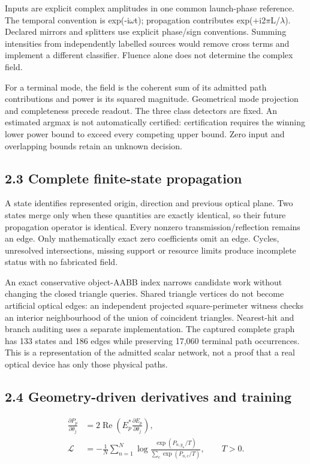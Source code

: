 \documentclass[11pt]{article}
\begin{document}
Inputs are explicit complex amplitudes in one common launch-phase reference. The temporal convention is exp(-i$\omega$t); propagation contributes exp(+i2$\pi$L/$\lambda$). Declared mirrors and splitters use explicit phase/sign conventions. Summing intensities from independently labelled sources would remove cross terms and implement a different classifier. Fluence alone does not determine the complex field.

For a terminal mode, the field is the coherent sum of its admitted path contributions and power is its squared magnitude. Geometrical mode projection and completeness precede readout. The three class detectors are fixed. An estimated argmax is not automatically certified: certification requires the winning lower power bound to exceed every competing upper bound. Zero input and overlapping bounds retain an unknown decision.

\subsection*{2.3 Complete finite-state propagation}

A state identifies represented origin, direction and previous optical plane. Two states merge only when these quantities are exactly identical, so their future propagation operator is identical. Every nonzero transmission/reflection remains an edge. Only mathematically exact zero coefficients omit an edge. Cycles, unresolved intersections, missing support or resource limits produce incomplete status with no fabricated field.

An exact conservative object-AABB index narrows candidate work without changing the closed triangle queries. Shared triangle vertices do not become artificial optical edges: an independent projected square-perimeter witness checks an interior neighbourhood of the union of coincident triangles. Nearest-hit and branch auditing uses a separate implementation. The captured complete graph has 133 states and 186 edges while preserving 17,060 terminal path occurrences. This is a representation of the admitted scalar network, not a proof that a real optical device has only those physical paths.

\subsection*{2.4 Geometry-driven derivatives and training}
\begin{align}
 \frac{\partial P_p}{\partial\theta_j}&=2\operatorname{Re}\!\left(E_p^*\frac{\partial E_p}{\partial\theta_j}\right),\\
 \mathcal{L}&=-\frac1N\sum_{n=1}^{N}\log\frac{\exp(P_{n,y_n}/T)}{\sum_c\exp(P_{n,c}/T)},\qquad T>0.
\end{align}
\end{document}
